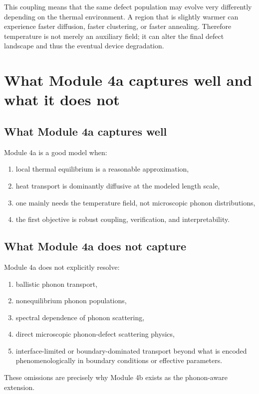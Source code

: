 \documentclass[11pt]{article}
\begin{document}
This coupling means that the same defect population may evolve very differently depending on the thermal environment. A region that is slightly warmer can experience faster diffusion, faster clustering, or faster annealing. Therefore temperature is not merely an auxiliary field; it can alter the final defect landscape and thus the eventual device degradation.

\section{What Module 4a captures well and what it does not}

\subsection{What Module 4a captures well}

Module 4a is a good model when:
\begin{enumerate}[label=\arabic*.]
    \item local thermal equilibrium is a reasonable approximation,
    \item heat transport is dominantly diffusive at the modeled length scale,
    \item one mainly needs the temperature field, not microscopic phonon distributions,
    \item the first objective is robust coupling, verification, and interpretability.
\end{enumerate}

\subsection{What Module 4a does not capture}

Module 4a does not explicitly resolve:
\begin{enumerate}[label=\arabic*.]
    \item ballistic phonon transport,
    \item nonequilibrium phonon populations,
    \item spectral dependence of phonon scattering,
    \item direct microscopic phonon-defect scattering physics,
    \item interface-limited or boundary-dominated transport beyond what is encoded phenomenologically in boundary conditions or effective parameters.
\end{enumerate}

These omissions are precisely why Module 4b exists as the phonon-aware extension.
\end{document}
